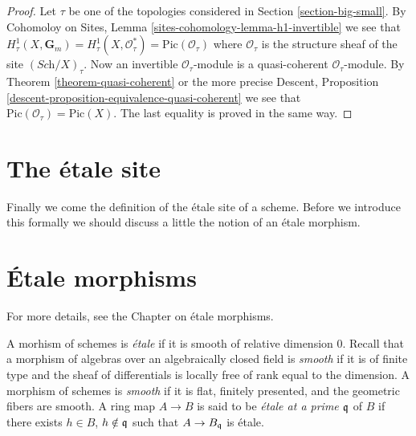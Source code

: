 \begin{proof}
Let $\tau$ be one of the topologies considered in
Section \ref{section-big-small}.
By
Cohomoloy on Sites, Lemma \ref{sites-cohomology-lemma-h1-invertible}
we see that
$H^1_\tau(X, \mathbf{G}_m) =
H^1_\tau(X, \mathcal{O}_\tau^*) =
\text{Pic}(\mathcal{O}_\tau)$
where $\mathcal{O}_\tau$ is the structure sheaf of the site
$(\textit{Sch}/X)_\tau$. Now an invertible $\mathcal{O}_\tau$-module
is a quasi-coherent $\mathcal{O}_\tau$-module.
By Theorem \ref{theorem-quasi-coherent} or the more precise
Descent, Proposition \ref{descent-proposition-equivalence-quasi-coherent}
we see that $\text{Pic}(\mathcal{O}_\tau) = \text{Pic}(X)$.
The last equality is proved in the same way.
\end{proof}






\section{The \'etale site}
\label{section-etale-site}

\noindent
Finally we come the definition of the \'etale site of a scheme.
Before we introduce this formally we should discuss a little the
notion of an \'etale morphism.






\section{\'Etale morphisms}
\label{section-etale-morphism}

\noindent
For more details, see the Chapter on \'etale morphisms.

\begin{definition}
\label{definition-etale-morphism}
A morhism of schemes is {\it \'etale} if it is smooth of relative dimension 0.
Recall that a morphism of algebras over an algebraically closed field is
{\it smooth} if it is of finite type and the sheaf of differentials is locally
free of rank equal to the dimension. A morphism of schemes is {\it smooth} if
it is flat, finitely presented, and the geometric fibers are smooth. A ring map
$A \to B$ is said to be {\it \'etale at a prime $\frak q$} of $B$ if there
exists $h \in B$, $h \notin \frak q$ such that $A \to B_{\frak q}$ is \'etale.
\end{definition}

